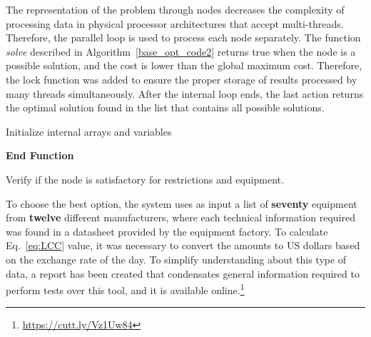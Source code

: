 \documentclass[a4paper,donotrepeattitle,fleqn]{cas-dc}
\begin{document}
The representation of the problem through nodes decreases the complexity of processing data in physical processor architectures that accept multi-threads. Therefore, the parallel loop is used to process each node separately. The function \textit{solve} described in Algorithm~\ref{base_opt_code2} returns true when the node is a possible solution, and the cost is lower than the global maximum cost. Therefore, the lock function was added to ensure the proper storage of results processed by many threads simultaneously. After the internal loop ends, the last action returns the optimal solution found in the list that contains all possible solutions.

\begin{algorithm}[ht]
\SetAlgoLined
{}
 Initialize internal arrays and variables\;
 
\textbf{End Function}\;
\caption{Verify if the node is satisfactory for restrictions and equipment.}
\label{base_opt_code2}
\end{algorithm}

To choose the best option, the system uses as input a list of \textbf{seventy} equipment from \textbf{twelve} 
different manufacturers, where each technical information required was found in a datasheet provided by the equipment factory. To calculate Eq.~\eqref{eq:LCC} value,
it was necessary to convert the amounts to US dollars based on the exchange rate of the day. To simplify understanding about this type of data, a report has been created that condensates general information required to perform tests over this tool, and it is available online.\footnote{\label{note1}\href{https://cutt.ly/Vz1Uw84}{https://cutt.ly/Vz1Uw84}}
\end{document}
